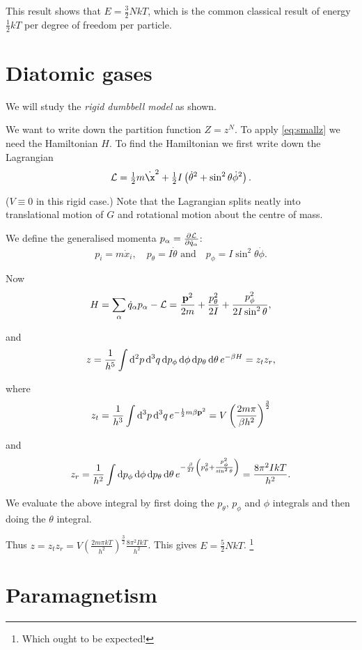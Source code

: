 \documentclass{notes}
\newcommand{\cL}{\mathcal{L}}
\begin{document}
This result shows that $E = \tfrac{3}{2} N k T$, which is the
common classical result of energy $\tfrac{1}{2} k T$
per degree of freedom per particle.

\section{Diatomic gases}

We will study the \emph{rigid dumbbell model} as shown.

\vspace{1in}

We want to write down the partition function $Z = z^N$. To apply
\eqref{eq:smallz} we need the Hamiltonian $H$.  To find the
Hamiltonian we first write down the Lagrangian
\[
\cL = \tfrac{1}{2} m \Dot{\x}^2 + \tfrac{1}{2} I \left(
\Dot{\theta}^2 + \sin^2 \theta \Dot{\phi}^2 \right).
\]

($V \equiv 0$ in this rigid case.)  Note that the Lagrangian
splits neatly into translational motion of $G$ and rotational
motion about the centre of mass.

We define the generalised momenta
$p_\alpha = \pd{\cL}{\Dot{q}_\alpha}$:
\[
p_i = m \Dot{x}_i, \quad p_\theta = I \Dot{\theta} \text{ and}\quad
p_\phi = I \sin^2 \theta \Dot{\phi}.
\]

Now
\[
H = \sum_\alpha \Dot{q}_\alpha p_\alpha - \cL
= \frac{\vect{p}^2}{2 m} + \frac{p_\theta^2}{2 I}
+ \frac{p_\phi^2}{2 I \sin^2 \theta},
\]

and
\[
z = \frac{1}{h^5} \int \mathrm{d}^2 p\, \mathrm{d}^3 q\, \mathrm{d} p_\phi\, \mathrm{d} \phi\,
\mathrm{d} p_\theta\, \mathrm{d} \theta\, e^{-\beta H} = z_t z_r,
\]

where
\[
z_t = \frac{1}{h^3} \int \mathrm{d}^3 p\, \mathrm{d}^3 q\, e^{-\frac{1}{2} m \beta
\mathbf{p}^2} = V \left( \frac{2 m \pi}{\beta h^2} \right)^{\frac{3}{2}}
\]

and
\[
z_r = \frac{1}{h^2} \int \mathrm{d} p_\phi\, \mathrm{d} \phi\,
\mathrm{d} p_\theta\, \mathrm{d} \theta\, e^{-\frac{\beta}{2 I} \left( p_\theta^2
+ \frac{p_\phi^2}{\sin^2 \theta} \right)}
= \frac{8 \pi^2 I k T}{h^2}.
\]

We evaluate the above integral by first doing the
$p_\theta$, $p_\phi$ and $\phi$ integrals and then doing the
$\theta$ integral.

Thus $z = z_t z_r = V \left( \frac{2 m \pi k T}{h^2} \right)^{\frac{3}{2}}
\frac{8 \pi^2 I k T}{h^2}$. This gives
$E = \tfrac{5}{2} N k T$.%
\footnote{Which ought to be expected!}

\section{Paramagnetism}
\end{document}
